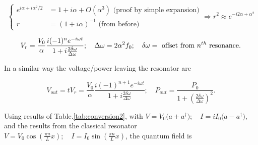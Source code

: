 \begin{equation}\label{tlineApprox}
 	\left\lbrace
 	\begin{aligned}
 		e^{i\alpha+i\alpha^2/2} & = 1+i\alpha +O(\alpha^3) \text{ (proof by simple expansion)}\\
 		r & = (1+i\alpha)^{-1} \text{ (from before)}
 	\end{aligned}\right.\Rightarrow r^2 \approx e^{-i2\alpha +\alpha^2}
 \end{equation}
 
 \noindent {}
 
 \begin{equation}\label{tlineVoltage}
	V_r = \frac{V_0}{\alpha}\frac{i(-1)^{n}e^{-i\omega t}}{1+i\frac{2\delta\omega}{\Delta\omega}};\quad \Delta\omega = 2\alpha^2f_0;\quad \delta\omega = \text{ offset from $ n^{th} $ resonance}.
 \end{equation}
 
 \noindent {} In a similar way the voltage/power leaving the resonator are
 
 \begin{equation}\label{tlineLeaving}
 	V_{out} = tV_r = \frac{V_0}{\alpha}\frac{i(-1)^{n+1}e^{-i\omega t}}{1+i\frac{2\delta\omega}{\Delta\omega}}; \quad P_{out} = \frac{P_0}{1+\left(\frac{2\delta\omega}{\Delta\omega}\right)^2}.
 \end{equation}
 
  \begin{figure}[h]
 \end{figure}


 
 
   \begin{figure}[h]
 \end{figure}
 
   Using results of Table.\ref{tab:conversion2}, with $ V = V_0\bigg(a+a^\dagger\bigg);\quad I = iI_0\bigg(a-a^\dagger\bigg) $, and the results from the classical resonator $ V=V_0\cos(\frac{\pi n}{L}x);\quad I=I_0\sin(\frac{\pi n}{L}x) $, the quantum field is
   
